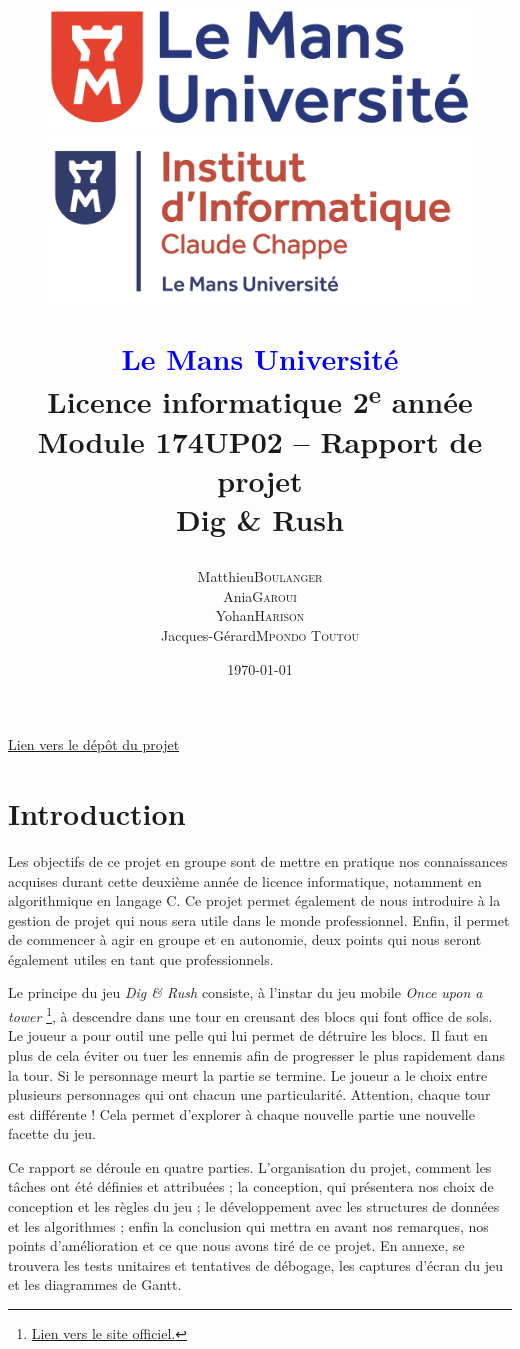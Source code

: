 \documentclass[a4paper,12pt]{article}
\title{
    \begin{figure}[!t]
	\begin{minipage}{.25\textwidth}
	    \includegraphics[width=\textwidth]{img/logo_lmu.png}
	\end{minipage}
	\hspace{.5\textwidth}
	\begin{minipage}{.25\textwidth}
	    \includegraphics[width=\textwidth]{img/logo_ic2.png}
	\end{minipage}
    \end{figure}
    \begin{center}
	\textbf{\textcolor{blue}{Le Mans Université}} \\
	Licence informatique 2\textsuperscript{e} année \\
	Module 174UP02 – Rapport de projet \\
	\textbf{Dig \& Rush}
    \end{center}
}
\author{
	\begin{tabular}{rl}
	    Matthieu & \textsc{Boulanger} \\
	    Ania & \textsc{Garoui} \\
	    Yohan & \textsc{Harison} \\
	    Jacques-Gérard & \textsc{Mpondo Toutou}
	\end{tabular}
}
\date{\today}
\begin{document}
\maketitle
\begin{center}
    \href{https://github.com/idlusen/dig-and-rush/}{Lien vers le dépôt du projet}
\end{center}
\newpage

\tableofcontents
\newpage


\section{Introduction}

Les objectifs de ce projet en groupe sont de mettre en pratique nos connaissances acquises durant cette deuxième année de licence informatique, notamment en algorithmique en langage C.
Ce projet permet également de nous introduire à la gestion de projet qui nous sera utile dans le monde professionnel. 
Enfin, il permet de commencer à agir en groupe et en autonomie, deux points qui nous seront également utiles en tant que professionnels.

Le principe du jeu \textit{Dig \& Rush} consiste, à l’instar du jeu mobile \textit{Once upon a tower} \footnote{\href{https://www.pomelogames.com/once-upon-a-tower}{Lien vers le site officiel.}}, à descendre dans une tour en creusant des blocs qui font office de sols. 
Le joueur a pour outil une pelle qui lui permet de détruire les blocs. 
Il faut en plus de cela éviter ou tuer les ennemis afin de progresser le plus rapidement dans la tour. 
Si le personnage meurt la partie se termine. Le joueur a le choix entre plusieurs personnages qui ont chacun une particularité.
Attention, chaque tour est différente ! Cela permet d’explorer à chaque nouvelle partie une nouvelle facette du jeu.

Ce rapport se déroule en quatre parties. 
L’organisation du projet, comment les tâches ont été définies et attribuées ; la conception, qui présentera nos choix de conception et les règles du jeu ; le développement avec les structures de données et les algorithmes ; enfin la conclusion qui mettra en avant nos remarques, nos points d’amélioration et ce que nous avons tiré de ce projet. 
En annexe, se trouvera les tests unitaires et tentatives de débogage, les captures d’écran du jeu et les diagrammes de Gantt.
\end{document}
